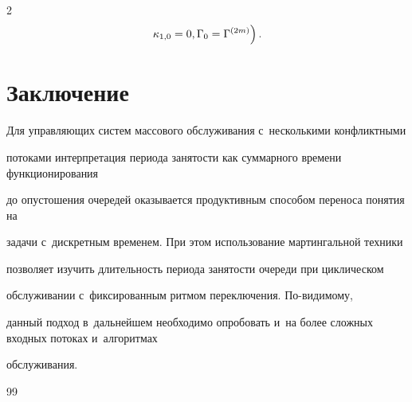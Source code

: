 \begin{multicols}{2}
\begin{multline*}
 \left.     \kappa_{1,0}=0,    \Gamma_0=\Gamma^{(2m)}

 \vphantom{\left[ \fr{\nu(0)-1}{2m} \right]}

  \right) .


  \end{multline*}



\vspace*{-24pt}







\section{Заключение}



\vspace*{-3pt}



Для управляющих систем массового обслуживания с~несколькими конфликтными

потоками интерпретация периода занятости как суммарного времени функционирования

до опустошения очередей оказывается продуктивным способом переноса понятия на

задачи с~дискретным временем. При этом использование мартингальной техники

позволяет изучить длительность периода занятости очереди при циклическом

обслуживании с~фиксированным ритмом переключения. По-ви\-ди\-мо\-му, 

данный подход в~дальнейшем необходимо опробовать и~на более сложных входных потоках и~алгоритмах

обслуживания.



\vspace*{-8pt}



{\small\frenchspacing

 {\baselineskip=10.8pt


 

 \vspace*{-6pt}

 

 \begin{thebibliography}{99}   


\end{thebibliography}}}
\end{multicols}
